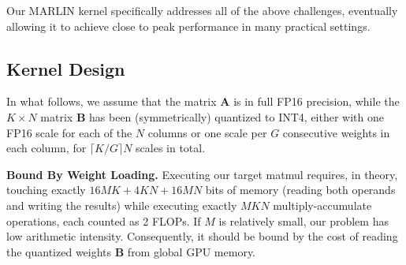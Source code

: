 \documentclass{article}
\theoremstyle{plain}
\theoremstyle{definition}
\theoremstyle{remark}
\newcommand{\htor}[1]{\textcolor{green}{[htor: #1]}}
\newcommand{\dan}[1]{\textcolor{blue}{[dan: #1]}}
\renewcommand{\paragraph}[1]{\vspace{0.1em}\noindent\textbf{#1}}
\begin{document}
Our MARLIN kernel specifically addresses all of the above challenges, eventually allowing it to achieve close to peak performance in many practical settings.




\subsection{Kernel Design}

In what follows, we assume that the matrix $\mathbf{A}$ is in full FP16 precision, while the $K\times N$ matrix $\mathbf{B}$ has been (symmetrically) quantized to INT4, either with one FP16 scale for each of the $N$ columns or one scale per $G$ consecutive weights in each column, for $\lceil K/G \rceil N$ scales in total.

\paragraph{Bound By Weight Loading.}
Executing our target matmul requires, in theory, touching exactly $16MK + 4KN + 16MN$ bits of memory (reading both operands and writing the results) while executing exactly $MKN$ multiply-accumulate operations, each counted as 2 FLOPs. If $M$ is relatively small, our problem has low arithmetic intensity. Consequently, it should be bound by the cost of reading the quantized weights $\mathbf{B}$ from global GPU memory.
\end{document}
